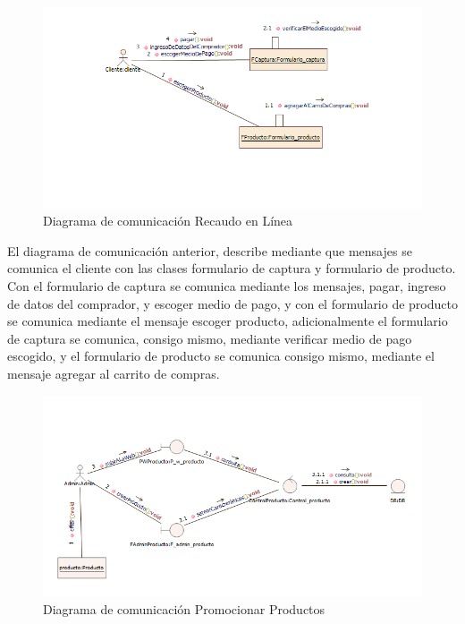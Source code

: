 \begin{figure}[h!]
	\centering
	\includegraphics[width=1.1\linewidth]{arquitectura/imagenes/Diagrama_comunicacion_re}
	\caption{Diagrama de comunicación Recaudo en Línea}
\end{figure}

El diagrama de comunicación anterior, describe mediante que mensajes se comunica el cliente con las clases formulario de captura y formulario de producto. Con el formulario de captura se comunica mediante los mensajes, pagar, ingreso de datos del comprador, y escoger medio de pago, y con el formulario de producto se comunica mediante el mensaje  escoger producto, adicionalmente el formulario de captura se comunica, consigo mismo, mediante verificar medio de pago escogido, y el formulario de producto se comunica consigo mismo, mediante el mensaje agregar al carrito de compras.


\newpage
\begin{figure}[th!]
	\centering
	\includegraphics[width=1.1\linewidth]{arquitectura/imagenes/Diagrama_comunicacion_pp}
	\caption{Diagrama de comunicación Promocionar Productos}
	\label{fig:diagramacomunicacionpp}
\end{figure}

